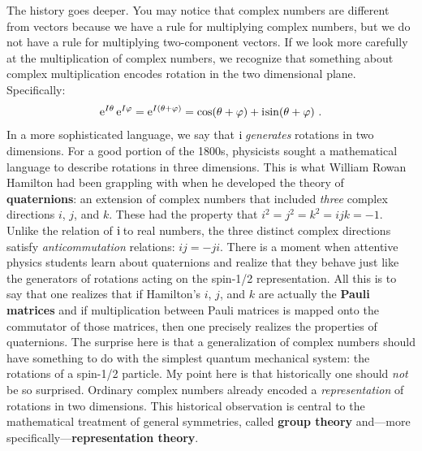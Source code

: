 \begin{subappendices}
The history goes deeper. You may notice that complex numbers are different from vectors because we have a rule for multiplying complex numbers, but we do not have a rule for multiplying two-component vectors. If we look more carefully at the multiplication of complex numbers, we recognize that something about complex multiplication encodes rotation in the two dimensional plane. Specifically:
\begin{align}
    \operatorname{e}^{I\theta} \operatorname{e}^{I\varphi} = \operatorname{e}^{I(\theta+\varphi)} 
    = \cos(\theta+\varphi) + \operatorname{i}\mkern-2mu \sin(\theta+\varphi) \ .
\end{align}
In a more sophisticated language, we say that $\operatorname{i}\mkern-2mu$ \emph{generates} rotations in two dimensions. For a good portion of the 1800s, physicists sought a mathematical language to describe rotations in three dimensions. This is what William Rowan Hamilton had been grappling with when he developed the theory of \textbf{quaternions}: an extension of complex numbers that included \emph{three} complex directions $i$, $j$, and $k$. These had the property that $i^2 = j^2 = k^2 = ijk = -1$. Unlike the relation of $\operatorname{i}\mkern-2mu$ to real numbers, the three distinct complex directions satisfy \emph{anticommutation} relations: $ij = -ji$. There is a moment when attentive physics students learn about quaternions and realize that they behave just like the generators of rotations acting on the spin-1/2 representation. All this is to say that one realizes that if Hamilton's $i$, $j$, and $k$ are actually the \textbf{Pauli matrices} and if multiplication between Pauli matrices is mapped onto the commutator of those matrices, then one precisely realizes the properties of quaternions. The surprise here is that a generalization of complex numbers should have something to do with the simplest quantum mechanical system: the rotations of a spin-1/2 particle. My point here is that historically one should \emph{not} be so surprised. Ordinary complex numbers already encoded a \emph{representation} of rotations in two dimensions. This historical observation is central to the mathematical treatment of general symmetries, called \textbf{group theory} and---more specifically---\textbf{representation theory}.


\end{subappendices}

